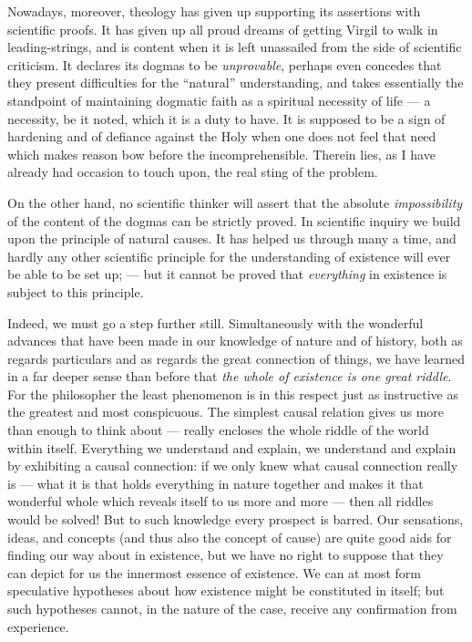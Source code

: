 \documentclass[12pt,a4paper,openany]{book}
\newcommand{\opage}[1]{\marginnote{\footnotesize\textit{[#1]}}}
\begin{document}
Nowadays, moreover, theology has given up supporting its assertions with
scientific proofs. It has given up all proud dreams of getting Virgil to walk
in leading-strings, and
\opage{210}is content when it is left unassailed from the side of
scientific criticism. It declares its dogmas to be \emph{unprovable}, perhaps even
concedes that they present difficulties for the ``natural'' understanding, and
takes essentially the standpoint of maintaining dogmatic faith as a spiritual
necessity of life --- a necessity, be it noted, which it is a duty to have. It
is supposed to be a sign of hardening and of defiance against the Holy when one
does not feel that need which makes reason bow before the incomprehensible.
Therein lies, as I have already had occasion to touch upon, the real sting of
the problem.

On the other hand, no scientific thinker will assert that the absolute
\emph{impossibility} of the content of the dogmas can be strictly proved. In
scientific inquiry we build upon the principle of natural causes. It has helped
us through many a time, and hardly any other scientific principle for the
understanding of existence will ever be able to be set up; --- but it cannot be
proved that \emph{everything} in existence is subject to this principle.

Indeed, we must go a step further still. Simultaneously with the wonderful
advances that have been made in our knowledge of nature and of history, both as
regards particulars and as regards the great connection of things, we have
learned in a far deeper sense than before that \emph{the whole of existence is one
great riddle}. For the philosopher the least phenomenon is in this respect just
as instructive as the greatest and most conspicuous. The simplest causal
relation gives us more than enough to think about --- really encloses the whole
riddle of the world within itself. Everything we understand and explain, we
understand and explain by exhibiting a causal connection: if we only knew what
causal connection really is --- what it is that holds everything in nature
together and makes it that wonderful whole which reveals itself to us more and
more --- then all riddles would be solved! But to such knowledge every prospect
is barred. Our sensations, ideas, and concepts (and thus also the
concept of cause) are quite good aids for finding our way about in existence,
but we have no right to suppose that they can depict for us the
\opage{211}innermost essence of existence. We can at most form speculative hypotheses about how
existence might be constituted in itself; but such hypotheses cannot, in the
nature of the case, receive any confirmation from experience.
\end{document}
